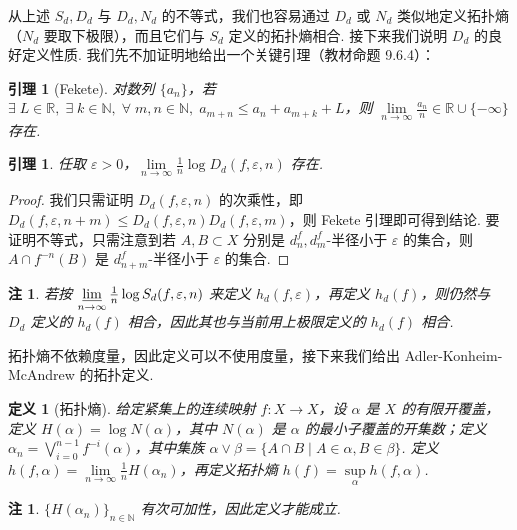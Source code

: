 \documentclass[11pt, a4paper, oneside]{ctexart}
\newtheorem{definition}[theorem]{定义}
\newtheorem{lemma}[theorem]{引理}
\newtheorem{remark}[theorem]{注}
\newcommand{\N}{\mathbb{N}}
\newcommand{\R}{\mathbb{R}}
\begin{document}
    从上述 $S_d,D_d$ 与 $D_d,N_d$ 的不等式，我们也容易通过 $D_d$ 或 $N_d$ 类似地定义拓扑熵（$N_d$ 要取下极限），而且它们与 $S_d$ 定义的拓扑熵相合. 接下来我们说明 $D_d$ 的良好定义性质. 我们先不加证明地给出一个关键引理（教材命题 9.6.4）：
    \begin{lemma}[Fekete]
        对数列 $\{a_n\}$，若 $\exists\; L\in\R,\; \exists\; k\in\N,\; \forall\; m,n\in\N,\; a_{m+n}\leq a_n+a_{m+k}+L$，则 $\lim\limits_{n\to\infty}\frac{a_n}{n}\in \R\cup\{-\infty\}$ 存在.
    \end{lemma}
    \begin{lemma}
        任取 $\varepsilon>0$，$\lim\limits_{n\to\infty}\frac{1}{n}\log D_d(f,\varepsilon,n)$ 存在.
    \end{lemma}
    \begin{proof}
        我们只需证明 $D_d(f,\varepsilon,n)$ 的次乘性，即 $D_d(f,\varepsilon,n+m)\leq D_d(f,\varepsilon,n)D_d(f,\varepsilon,m)$，则 Fekete 引理即可得到结论. 要证明不等式，只需注意到若 $A,B\subset X$ 分别是 $d_n^f,d_m^f$-半径小于 $\varepsilon$ 的集合，则 $A\cap f^{-n}(B)$ 是 $d_{n+m}^f$-半径小于 $\varepsilon$ 的集合.
    \end{proof}
    \begin{remark}
        若按 $\varliminf\limits_{n\to\infty}\frac{1}{n}\log S_d(f,\varepsilon,n)$ 来定义 $h_d(f,\varepsilon)$，再定义 $h_d(f)$，则仍然与 $D_d$ 定义的 $h_d(f)$ 相合，因此其也与当前用上极限定义的 $h_d(f)$ 相合.
    \end{remark}

    拓扑熵不依赖度量，因此定义可以不使用度量，接下来我们给出 Adler-Konheim-McAndrew 的拓扑定义.
    \begin{definition}[拓扑熵]
        给定紧集上的连续映射 $f:X\to X$，设 $\alpha$ 是 $X$ 的有限开覆盖，定义 $H(\alpha)=\log N(\alpha)$，其中 $N(\alpha)$ 是 $\alpha$ 的最小子覆盖的开集数；定义 $\alpha_n=\bigvee\limits_{i=0}^{n-1}f^{-i}(\alpha)$，其中集族 $\alpha\vee\beta=\{A\cap B\mid A\in \alpha,B\in\beta\}$. 定义 $h(f,\alpha)=\lim\limits_{n\to\infty}\frac{1}{n}H(\alpha_n)$，再定义拓扑熵 $h(f)=\sup\limits_{\alpha}h(f,\alpha)$.
    \end{definition}
    \begin{remark}
        ${\{H(\alpha_n)\}}_{n\in\N}$ 有次可加性，因此定义才能成立.
    \end{remark}
\end{document}
